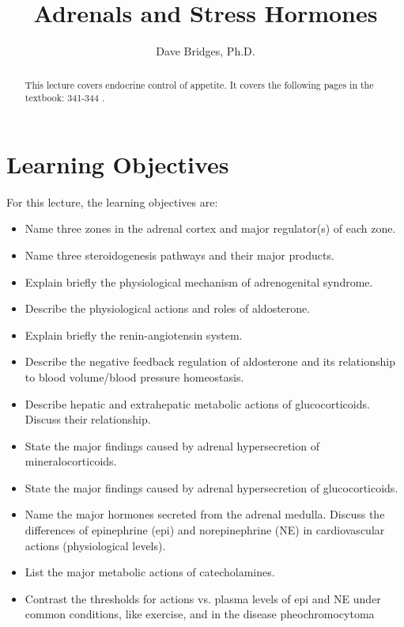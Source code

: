 \documentclass{tufte-handout}
\title{Adrenals and Stress Hormones}
\author{Dave Bridges, Ph.D.}
\begin{document}
\maketitle%

\begin{abstract}
\noindent This lecture covers endocrine control of appetite.  It covers the following pages in the textbook: 341-344 \cite{Widmaier2013}.
\end{abstract}

\tableofcontents

\pagebreak

\section{Learning Objectives}
For this lecture, the learning objectives are:
\begin{itemize}
\item Name three zones in the adrenal cortex and major regulator(s) of each zone.
\item Name three steroidogenesis pathways and their major products.
\item Explain briefly the physiological mechanism of adrenogenital syndrome.
\item Describe the physiological actions and roles of aldosterone.
\item Explain briefly the renin-angiotensin system.
\item Describe the negative feedback regulation of aldosterone and its relationship to blood volume/blood pressure homeostasis.
\item Describe hepatic and extrahepatic metabolic actions of glucocorticoids. Discuss their relationship.
\item State the major findings caused by adrenal hypersecretion of mineralocorticoids.
\item State the major findings caused by adrenal hypersecretion of glucocorticoids.
\item Name the major hormones secreted from the adrenal medulla. Discuss the differences of epinephrine (epi) and norepinephrine (NE) in cardiovascular actions (physiological levels). 
\item List the major metabolic actions of catecholamines.
\item Contrast the thresholds for actions vs. plasma levels of epi and NE under common conditions, like exercise, and in the disease pheochromocytoma

\end{itemize}
\end{document}
